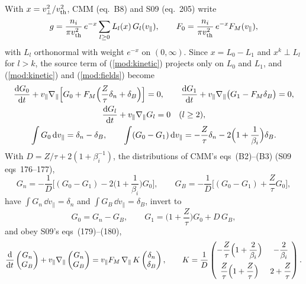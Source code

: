 With $x=v_\perp^2/v_{\mathrm{th}}^2$, CMM (eq.~B8) and S09 (eq.~205) write
\begin{equation*}
  g=\frac{n_i}{\pi v_{\mathrm{th}}^2}\,e^{-x}\sum_{l\ge0}L_l(x)\,G_l(v_\parallel),\qquad
  F_0=\frac{n_i}{\pi v_{\mathrm{th}}^2}\,e^{-x}F_M(v_\parallel),
\end{equation*}
with $L_l$ orthonormal with weight $e^{-x}$ on $(0,\infty)$. Since $x=L_0-L_1$ and $x^k\perp L_l$ for $l>k$, the source term of (\ref{mod:kinetic}) projects only on $L_0$ and $L_1$, and (\ref{mod:kinetic}) and (\ref{mod:fields}) become
\begin{gather*}
  \frac{\mathrm{d} G_0}{\mathrm{d} t}+v_\parallel\nabla_\parallel\Big[G_0+F_M\Big(\frac{Z}{\tau}\delta_n+\delta_B\Big)\Big]=0,\qquad
  \frac{\mathrm{d} G_1}{\mathrm{d} t}+v_\parallel\nabla_\parallel\big(G_1-F_M\delta_B\big)=0,\\
  \frac{\mathrm{d} G_l}{\mathrm{d} t}+v_\parallel\nabla_\parallel G_l=0\quad(l\ge2),\\
  \int G_0\,\mathrm{d} v_\parallel=\delta_n-\delta_B,\qquad
  \int(G_0-G_1)\,\mathrm{d} v_\parallel=-\frac{Z}{\tau}\delta_n-2\Big(1+\frac{1}{\beta_i}\Big)\delta_B .
\end{gather*}
With $D=Z/\tau+2(1+\beta_i^{-1})$, the distributions of CMM's eqs~(B2)--(B3) (S09 eqs~176--177),
\begin{equation*}
  G_n=-\frac{1}{D}\Big[(G_0-G_1)-2\Big(1+\frac{1}{\beta_i}\Big)G_0\Big],\qquad
  G_B=-\frac{1}{D}\Big[(G_0-G_1)+\frac{Z}{\tau}G_0\Big],
\end{equation*}
have $\int G_n\,\dd v_\parallel=\delta_n$ and $\int G_B\,\dd v_\parallel=\delta_B$, invert to
\begin{equation}\label{appA:G01}
  G_0=G_n-G_B,\qquad G_1=\Big(1+\frac{Z}{\tau}\Big)G_0+D\,G_B ,
\end{equation}
and obey S09's eqs~(179)--(180),
\begin{equation*}
  \frac{\mathrm{d}}{\mathrm{d} t}\begin{pmatrix}G_n\\ G_B\end{pmatrix}+v_\parallel\nabla_\parallel\begin{pmatrix}G_n\\ G_B\end{pmatrix}
  =v_\parallel F_M\,\nabla_\parallel\,K\begin{pmatrix}\delta_n\\ \delta_B\end{pmatrix},\qquad
  K=\frac{1}{D}\begin{pmatrix}-\dfrac{Z}{\tau}\Big(1+\dfrac{2}{\beta_i}\Big) & -\dfrac{2}{\beta_i}\\[10pt]
  \dfrac{Z}{\tau}\Big(1+\dfrac{Z}{\tau}\Big) & 2+\dfrac{Z}{\tau}\end{pmatrix}.
\end{equation*}
